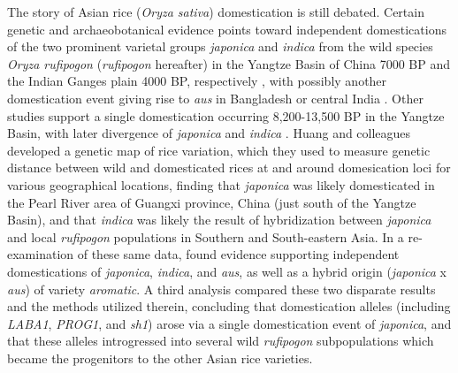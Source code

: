 \documentclass[11pt]{article}
\begin{document}
\begin{enumerate}
The story of Asian rice (\emph{Oryza sativa}) domestication is still debated.
Certain genetic and archaeobotanical evidence points toward independent domestications of the two prominent varietal groups \emph{japonica} and \emph{indica} from the wild species \emph{Oryza rufipogon} (\emph{rufipogon} hereafter) in the Yangtze Basin of China 7000 BP and the Indian Ganges plain 4000 BP, respectively \cite{fuller2010consilience}, with possibly another domestication event giving rise to \emph{aus} in Bangladesh or central India \cite{civavn2015three}.
Other studies support a single domestication occurring 8,200-13,500 BP in the Yangtze Basin, with later divergence of \emph{japonica} and \emph{indica} \cite{molina2011molecular, Huang2012}.
Huang and colleagues \cite{Huang2012} developed a genetic map of rice variation, which they used to measure genetic distance between wild and domesticated rices at and around domesication loci for various geographical locations, finding that \emph{japonica} was likely domesticated in the Pearl River area of Guangxi province, China (just south of the Yangtze Basin), and that \emph{indica} was likely the result of hybridization between \emph{japonica} and local \emph{rufipogon} populations in Southern and South-eastern Asia.
In a re-examination of these same data, \cite{civavn2015three} found evidence supporting independent domestications of \emph{japonica}, \emph{indica}, and \emph{aus}, as well as a hybrid origin (\emph{japonica} x \emph{aus}) of variety \emph{aromatic}.
A third analysis \cite{choi2018multiple} compared these two disparate results and the methods utilized therein, concluding that domestication alleles (including \emph{LABA1}, \emph{PROG1}, and \emph{sh1}) arose via a single domestication event of \emph{japonica}, and that these alleles introgressed into several wild \emph{rufipogon} subpopulations which became the progenitors to the other Asian rice varieties.





\end{enumerate}
\end{document}
